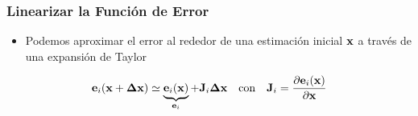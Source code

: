 \begin{frame}
    \frametitle{Linearizar la Función de Error}
    
    \begin{itemize}
        \item Podemos aproximar el error al rededor de una estimación inicial $\boldsymbol{\mathbf{x}}$ a través de una expansión de Taylor
    \end{itemize}
    
    \begin{equation*}
        \boldsymbol{\mathbf{e}}_{i}(\boldsymbol{\mathbf{x}} + \boldsymbol{\mathbf{\Delta}}\boldsymbol{\mathbf{x}}) \simeq  \underbrace{\boldsymbol{\mathbf{e}}_{i}(\boldsymbol{\mathbf{x}})}_{\boldsymbol{\mathbf{e}}_{i}} + \boldsymbol{\mathbf{J}}_{i}\boldsymbol{\mathbf{\Delta}}\boldsymbol{\mathbf{x}} \quad \text{con} \quad \boldsymbol{\mathbf{J}}_{i} = \dfrac{\partial\boldsymbol{\mathbf{e}}_{i}(\boldsymbol{\mathbf{x}})}{\partial\boldsymbol{\mathbf{x}}}
    \end{equation*}
    
\end{frame}

